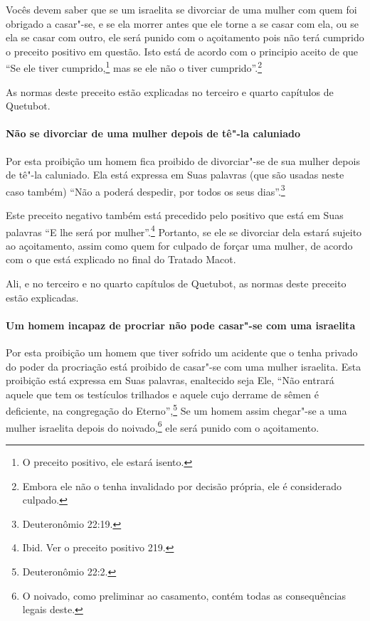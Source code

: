 \begin{multicols}{2}
Vocês devem saber que se um israelita se divorciar de uma mulher com
quem foi obrigado a casar"-se, e se ela morrer antes que ele torne a se
casar com ela, ou se ela se casar com outro, ele será punido com o
açoitamento pois não terá cumprido o preceito positivo em questão. Isto
está de acordo com o principio aceito de que ``Se ele tiver
cumprido,\footnote{O preceito positivo, ele estará isento.} mas se ele não o tiver
cumprido''.\footnote{Embora ele não o tenha invalidado por decisão própria, ele é
  considerado culpado.}

As normas deste preceito estão explicadas no terceiro e quarto capítulos de Quetubot\starr.

\paragraph{Não se divorciar de uma mulher depois de tê"-la caluniado}

Por esta proibição um homem fica proibido de divorciar"-se de sua mulher
depois de tê"-la caluniado. Ela está expressa em Suas palavras (que são
usadas neste caso também) ``Não a poderá despedir, por todos os seus
dias''.\footnote{Deuteronômio 22:19.}

Este preceito negativo também está precedido pelo positivo que está em
Suas palavras ``E lhe será por mulher''.\footnote{Ibid. Ver o preceito positivo 219.}
Portanto, se ele se divorciar dela estará sujeito ao açoitamento, assim
como quem for culpado de forçar uma mulher, de acordo com o que está
explicado no final do Tratado Macot\starr.

Ali, e no terceiro e no quarto capítulos de Quetubot\starr, as normas deste
preceito estão explicadas.

\paragraph{Um homem incapaz de procriar não pode casar"-se com uma israelita}

Por esta proibição um homem que tiver sofrido um acidente que o tenha
privado do poder da procriação está proibido de casar"-se com uma mulher
israelita. Esta proibição está expressa em Suas palavras, enaltecido
seja Ele, ``Não entrará aquele que tem os testículos trilhados e aquele
cujo derrame de sêmen é deficiente, na congregação do Eterno'',\footnote{Deuteronômio 22:2.} Se um homem assim chegar"-se a uma mulher israelita
depois do noivado,\footnote{O noivado, como preliminar ao casamento, contém todas as
consequências legais deste.} ele será punido com o
açoitamento.


\end{multicols}
